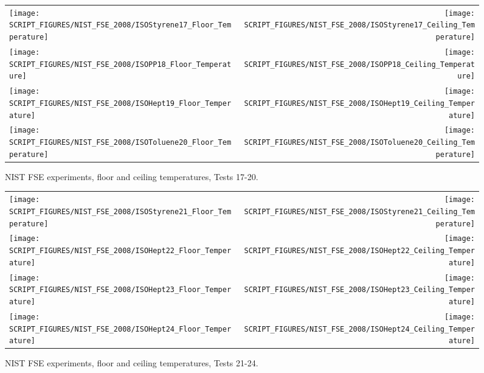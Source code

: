 \begin{figure}[p]
\begin{tabular*}{\textwidth}{l@{\extracolsep{\fill}}r}
\texttt{[image: SCRIPT\_FIGURES/NIST\_FSE\_2008/ISOStyrene17\_Floor\_Temperature]} &
\texttt{[image: SCRIPT\_FIGURES/NIST\_FSE\_2008/ISOStyrene17\_Ceiling\_Temperature]} \\
\texttt{[image: SCRIPT\_FIGURES/NIST\_FSE\_2008/ISOPP18\_Floor\_Temperature]} &
\texttt{[image: SCRIPT\_FIGURES/NIST\_FSE\_2008/ISOPP18\_Ceiling\_Temperature]} \\
\texttt{[image: SCRIPT\_FIGURES/NIST\_FSE\_2008/ISOHept19\_Floor\_Temperature]} &
\texttt{[image: SCRIPT\_FIGURES/NIST\_FSE\_2008/ISOHept19\_Ceiling\_Temperature]} \\
\texttt{[image: SCRIPT\_FIGURES/NIST\_FSE\_2008/ISOToluene20\_Floor\_Temperature]} &
\texttt{[image: SCRIPT\_FIGURES/NIST\_FSE\_2008/ISOToluene20\_Ceiling\_Temperature]}
\end{tabular*}
\caption[NIST FSE experiments, floor and ceiling temperatures, Tests 17-20]{NIST FSE experiments, floor and ceiling temperatures, Tests 17-20.}
\label{NIST_FSE_2008_Surface_Temp_4}
\end{figure}

\begin{figure}[p]
\begin{tabular*}{\textwidth}{l@{\extracolsep{\fill}}r}
\texttt{[image: SCRIPT\_FIGURES/NIST\_FSE\_2008/ISOStyrene21\_Floor\_Temperature]} &
\texttt{[image: SCRIPT\_FIGURES/NIST\_FSE\_2008/ISOStyrene21\_Ceiling\_Temperature]} \\
\texttt{[image: SCRIPT\_FIGURES/NIST\_FSE\_2008/ISOHept22\_Floor\_Temperature]} &
\texttt{[image: SCRIPT\_FIGURES/NIST\_FSE\_2008/ISOHept22\_Ceiling\_Temperature]} \\
\texttt{[image: SCRIPT\_FIGURES/NIST\_FSE\_2008/ISOHept23\_Floor\_Temperature]} &
\texttt{[image: SCRIPT\_FIGURES/NIST\_FSE\_2008/ISOHept23\_Ceiling\_Temperature]} \\
\texttt{[image: SCRIPT\_FIGURES/NIST\_FSE\_2008/ISOHept24\_Floor\_Temperature]} &
\texttt{[image: SCRIPT\_FIGURES/NIST\_FSE\_2008/ISOHept24\_Ceiling\_Temperature]}
\end{tabular*}
\caption[NIST FSE experiments, floor and ceiling temperatures, Tests 21-24]{NIST FSE experiments, floor and ceiling temperatures, Tests 21-24.}
\label{NIST_FSE_2008_Surface_Temp_5}
\end{figure}

